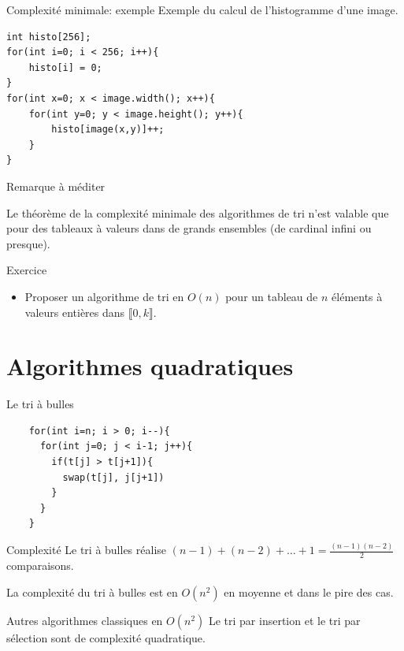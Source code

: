 \begin{frame}[fragile]{Complexité minimale: exemple}
  Exemple du calcul de l'histogramme d'une image.
 \begin{verbatim}
int histo[256];
for(int i=0; i < 256; i++){
    histo[i] = 0;
}
for(int x=0; x < image.width(); x++){
    for(int y=0; y < image.height(); y++){
        histo[image(x,y)]++;
    }
}
\end{verbatim}
\end{frame}

\begin{frame}{Remarque à méditer}

Le théorème de la complexité minimale des algorithmes de tri n'est valable que pour des tableaux à valeurs dans de grands ensembles (de cardinal infini ou presque).

\begin{exampleblock}{Exercice}
	\begin{itemize}
		\item Proposer un algorithme de tri en $O(n)$ pour un tableau de $n$ éléments à valeurs entières dans $\llbracket 0, k\rrbracket$.
	\end{itemize}
\end{exampleblock}

\end{frame}

\section{Algorithmes quadratiques}

\begin{frame}[fragile]{Le tri à bulles}
  \begin{verbatim}
    for(int i=n; i > 0; i--){
      for(int j=0; j < i-1; j++){
        if(t[j] > t[j+1]){
          swap(t[j], j[j+1])
        }
      }
    }
  \end{verbatim}
  \begin{block}{Complexité}
    Le tri à bulles réalise $(n-1) + (n-2) + \hdots + 1  = \frac{(n-1)(n-2)}{2}$ comparaisons.

    La complexité du tri à bulles est en $O(n^2)$ en moyenne et dans le pire des cas.
  \end{block}
  
  \begin{exampleblock}{Autres algorithmes classiques en $O(n^2)$}
  Le tri par insertion et le tri par sélection sont de complexité quadratique.
  \end{exampleblock}
\end{frame}


